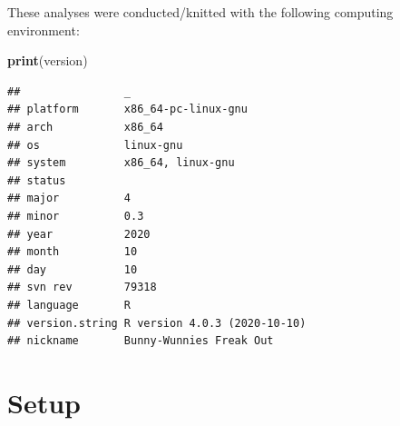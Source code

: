 \documentclass[]{book}
\newenvironment{Shaded}{\begin{snugshade}}{\end{snugshade}}
\newcommand{\KeywordTok}[1]{\textcolor[rgb]{0.13,0.29,0.53}{\textbf{#1}}}
\newcommand{\NormalTok}[1]{#1}
\begin{document}
These analyses were conducted/knitted with the following computing environment:

\begin{Shaded}
\begin{Highlighting}[]
\KeywordTok{print}\NormalTok{(version)}
\end{Highlighting}
\end{Shaded}

\begin{verbatim}
##                _                           
## platform       x86_64-pc-linux-gnu         
## arch           x86_64                      
## os             linux-gnu                   
## system         x86_64, linux-gnu           
## status                                     
## major          4                           
## minor          0.3                         
## year           2020                        
## month          10                          
## day            10                          
## svn rev        79318                       
## language       R                           
## version.string R version 4.0.3 (2020-10-10)
## nickname       Bunny-Wunnies Freak Out
\end{verbatim}

\hypertarget{setup-2}{%
\section{Setup}\label{setup-2}}
\end{document}
